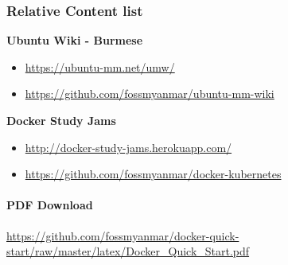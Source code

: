 \documentclass{article}
\begin{document}
\subsubsection{Relative Content list}\label{relative-content-list}

\textbf{Ubuntu Wiki - Burmese}

\begin{itemize}
\itemsep1pt\parskip0pt
\item
  \href{https://ubuntu-mm.net/umw/}{\url{https://ubuntu-mm.net/umw/}}\\
\item
  \href{https://github.com/fossmyanmar/ubuntu-mm-wiki}{\url{https://github.com/fossmyanmar/ubuntu-mm-wiki}}
\end{itemize}

\textbf{Docker Study Jams}

\begin{itemize}
\itemsep1pt\parskip0pt
\item
  \href{http://docker-study-jams.herokuapp.com/}{\url{http://docker-study-jams.herokuapp.com/}}\\
\item
  \href{https://github.com/fossmyanmar/docker-kubernetes}{\url{https://github.com/fossmyanmar/docker-kubernetes}}
\end{itemize}

\paragraph{PDF Download}\label{pdf-download}
\href{https://github.com/fossmyanmar/docker-quick-start/raw/master/latex/Docker\_Quick\_Start.pdf}{\url{https://github.com/fossmyanmar/docker-quick-start/raw/master/latex/Docker\_Quick\_Start.pdf}}

\pagebreak
\end{document}

